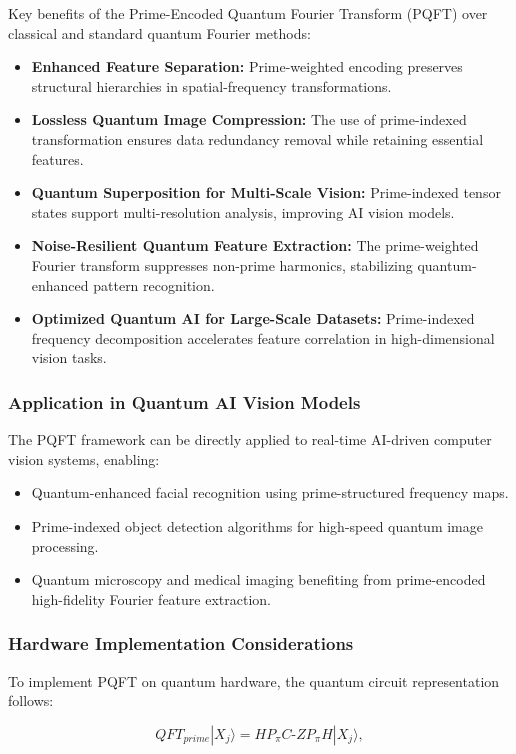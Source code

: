 \documentclass{article}
\theoremstyle{plain}
\begin{document}
\begin{itemize}
\begin{itemize}
Key benefits of the Prime-Encoded Quantum Fourier Transform (PQFT) over classical and standard quantum Fourier methods:

\begin{itemize}
    \item \textbf{Enhanced Feature Separation:} Prime-weighted encoding preserves structural hierarchies in spatial-frequency transformations.
    \item \textbf{Lossless Quantum Image Compression:} The use of prime-indexed transformation ensures data redundancy removal while retaining essential features.
    \item \textbf{Quantum Superposition for Multi-Scale Vision:} Prime-indexed tensor states support multi-resolution analysis, improving AI vision models.
    \item \textbf{Noise-Resilient Quantum Feature Extraction:} The prime-weighted Fourier transform suppresses non-prime harmonics, stabilizing quantum-enhanced pattern recognition.
    \item \textbf{Optimized Quantum AI for Large-Scale Datasets:} Prime-indexed frequency decomposition accelerates feature correlation in high-dimensional vision tasks.
\end{itemize}

\subsubsection{Application in Quantum AI Vision Models}
The PQFT framework can be directly applied to real-time AI-driven computer vision systems, enabling:
\begin{itemize}
    \item Quantum-enhanced facial recognition using prime-structured frequency maps.
    \item Prime-indexed object detection algorithms for high-speed quantum image processing.
    \item Quantum microscopy and medical imaging benefiting from prime-encoded high-fidelity Fourier feature extraction.
\end{itemize}

\subsubsection{Hardware Implementation Considerations}

To implement PQFT on quantum hardware, the quantum circuit representation follows:

\begin{equation}
QFT_{prime} |X_j\rangle = H P_{\pi} C\text{-}Z P_{\pi} H |X_j\rangle,
\end{equation}


\end{itemize}
\end{itemize}
\end{document}
